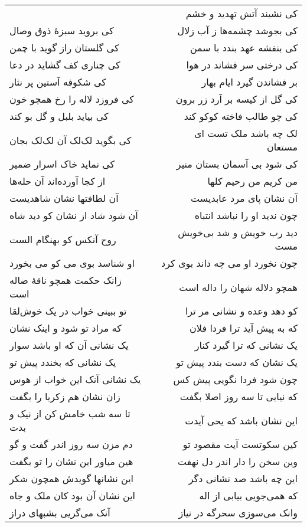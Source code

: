 \begin{center}
\begin{longtable}{l p{0.5cm} r}
&&
کی نشیند آتش تهدید و خشم
\\
کی بروید سبزهٔ ذوق وصال
&&
کی بجوشد چشمه‌ها ز آب زلال
\\
کی گلستان راز گوید با چمن
&&
کی بنفشه عهد بندد با سمن
\\
کی چناری کف گشاید در دعا
&&
کی درختی سر فشاند در هوا
\\
کی شکوفه آستین پر نثار
&&
بر فشاندن گیرد ایام بهار
\\
کی فروزد لاله را رخ همچو خون
&&
کی گل از کیسه بر آرد زر برون
\\
کی بیاید بلبل و گل بو کند
&&
کی چو طالب فاخته کوکو کند
\\
کی بگوید لک‌لک آن لک‌لک بجان
&&
لک چه باشد ملک تست ای مستعان
\\
کی نماید خاک اسرار ضمیر
&&
کی شود بی آسمان بستان منیر
\\
از کجا آورده‌اند آن حله‌ها
&&
من کریم من رحیم کلها
\\
آن لطافتها نشان شاهدیست
&&
آن نشان پای مرد عابدیست
\\
آن شود شاد از نشان کو دید شاه
&&
چون ندید او را نباشد انتباه
\\
روح آنکس کو بهنگام الست
&&
دید رب خویش و شد بی‌خویش مست
\\
او شناسد بوی می کو می بخورد
&&
چون نخورد او می چه داند بوی کرد
\\
زانک حکمت همچو ناقهٔ ضاله است
&&
همچو دلاله شهان را داله است
\\
تو ببینی خواب در یک خوش‌لقا
&&
کو دهد وعده و نشانی مر ترا
\\
که مراد تو شود و اینک نشان
&&
که به پیش آید ترا فردا فلان
\\
یک نشانی آن که او باشد سوار
&&
یک نشانی که ترا گیرد کنار
\\
یک نشانی که بخندد پیش تو
&&
یک نشان که دست بندد پیش تو
\\
یک نشانی آنک این خواب از هوس
&&
چون شود فردا نگویی پیش کس
\\
زان نشان هم زکریا را بگفت
&&
که نیایی تا سه روز اصلا بگفت
\\
تا سه شب خامش کن از نیک و بدت
&&
این نشان باشد که یحی آیدت
\\
دم مزن سه روز اندر گفت و گو
&&
کین سکوتست آیت مقصود تو
\\
هین میاور این نشان را تو بگفت
&&
وین سخن را دار اندر دل نهفت
\\
این نشانها گویدش همچون شکر
&&
این چه باشد صد نشانی دگر
\\
این نشان آن بود کان ملک و جاه
&&
که همی‌جویی بیابی از اله
\\
آنک می‌گریی بشبهای دراز
&&
وانک می‌سوزی سحرگه در نیاز

\end{longtable}
\end{center}
